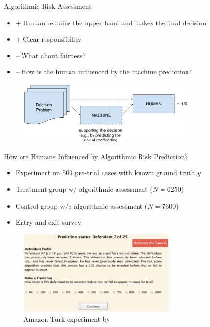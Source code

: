 \documentclass[11pt]{beamer}
\begin{document}
\begin{frame}{Algorithmic Risk Assessment}
\begin{itemize}
\setlength\itemsep{5pt}%

\item + Human remains the upper hand and makes the final decision
\item + Clear responsibility

\item -- What about fairness?
\item -- How is the human influenced by the machine prediction?
\end{itemize}

\begin{figure}[t!]
    \centering
        \includegraphics[width=0.8\textwidth]{Figures/human_decision.pdf}
\end{figure}
\end{frame}


\begin{frame}{How are Humans Influenced by Algorithmic Risk Prediction?}
\begin{itemize}
	\item Experiment on 500 pre-trial cases with known ground truth $y$
	\item Treatment group w/ algorithmic assessment ($N=6250$)
	\item Control group w/o algorithmic assessment ($N=7600$)
	\item Entry and exit survey 
\end{itemize}
\begin{figure}[t!]
	\centering
	\footnotesize
	\includegraphics[width=0.7\textwidth]{Figures/experimentscreen.png}
	\caption{Amazon Turk experiment by \cite{green2019disparate}}
\end{figure}
\end{frame}
\end{document}
